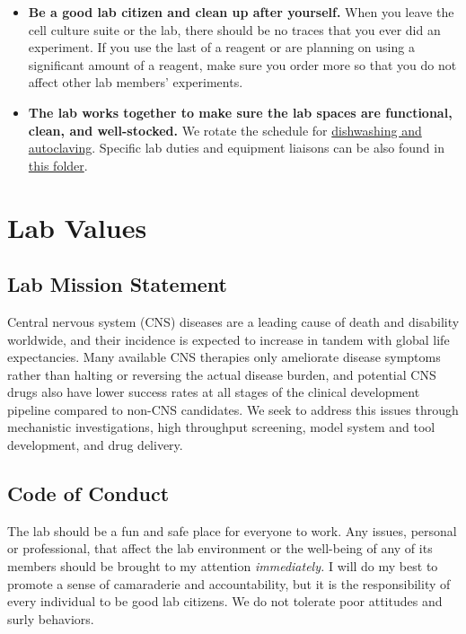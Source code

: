 \documentclass[
]{book}
\begin{document}
\begin{itemize}
\item
  \textbf{Be a good lab citizen and clean up after yourself.} When you leave the cell culture suite or the lab, there should be no traces that you ever did an experiment. If you use the last of a reagent or are planning on using a significant amount of a reagent, make sure you order more so that you do not affect other lab members' experiments.
\item
  \textbf{The lab works together to make sure the lab spaces are functional, clean, and well-stocked.} We rotate the schedule for \href{https://docs.google.com/document/d/1t22yeyYeN2KZLaDdAZ_DUKlDfBLG7_xTJaLKpJDBCfg/edit?usp=sharing}{dishwashing and autoclaving}. Specific lab duties and equipment liaisons can be also found in \href{https://drive.google.com/drive/folders/14ebHQuo8Vtq63692ZVmemCSDKaYOZeQi?usp=sharing}{this folder}.
\end{itemize}

\hypertarget{values}{%
\chapter{Lab Values}\label{values}}

\hypertarget{lab-mission-statement}{%
\section{Lab Mission Statement}\label{lab-mission-statement}}

Central nervous system (CNS) diseases are a leading cause of death and disability worldwide, and their incidence is expected to increase in tandem with global life expectancies. Many available CNS therapies only ameliorate disease symptoms rather than halting or reversing the actual disease burden, and potential CNS drugs also have lower success rates at all stages of the clinical development pipeline compared to non-CNS candidates. We seek to address this issues through mechanistic investigations, high throughput screening, model system and tool development, and drug delivery.

\hypertarget{code-of-conduct}{%
\section{Code of Conduct}\label{code-of-conduct}}

The lab should be a fun and safe place for everyone to work. Any issues, personal or professional, that affect the lab environment or the well-being of any of its members should be brought to my attention \emph{immediately.} I will do my best to promote a sense of camaraderie and accountability, but it is the responsibility of every individual to be good lab citizens. We do not tolerate poor attitudes and surly behaviors.
\end{document}
